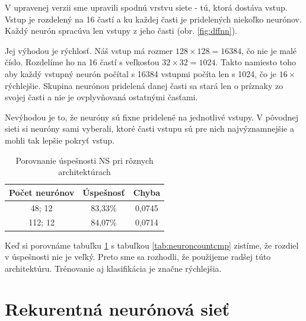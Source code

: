 V upravenej verzii sme upravili spodnú vrstvu siete - tú, ktorá dostáva vstup. Vstup je rozdelený na 16 častí a ku každej časti je pridelených niekoľko neurónov. Každý neurón spracúva len vstupy z jeho časti (obr. \ref{fig:dffnn}). 

Jej výhodou je rýchlosť. Náš vstup má rozmer $128\times 128 = 16384$, čo nie je malé číslo. Rozdelíme ho na 16 častí s veľkosťou $32\times 32 = 1024$. Takto namiesto toho aby každý vstupný neurón počítal s 16384 vstupmi počíta len s 1024, čo je $16\times$ rýchlejšie. Skupina neurónou pridelená danej časti sa stará len o príznaky zo svojej časti a nie je ovplyvňovaná ostatnými časťami. 

Nevýhodou je to, že neuróny sú fixne pridelené na jednotlivé vstupy. V pôvodnej sieti si neuróny sami vyberali, ktoré časti vstupu sú pre nich najvýznamnejšie a mohli tak lepšie pokryť vstup.

\begin{table}[hp]
\centering
\begin{tabular}{|c|c|c|}
\hline
\textbf{Počet neurónov} & \textbf{Úspešnosť} & \textbf{Chyba}\\ \hline
48; 12 & 83,33\% & 0,0745\\ \hline
112; 12 & 84,07\% & 0,0714\\
\hline
\end{tabular}
\caption{Porovnanie úspešnosti NS pri rôznych architektúrach}
\label{tab:neuroncountcmp2}
\end{table}

Keď si porovnáme tabuľku \ref{tab:neuroncountcmp2} s tabuľkou \ref{tab:neuroncountcmp} zistíme, že rozdiel v úspešnosti nie je veľký. Preto sme sa rozhodli, že použijeme radšej túto architektúru. Trénovanie aj klasifikácia je značne rýchlejšia.

\section{Rekurentná neurónová sieť}